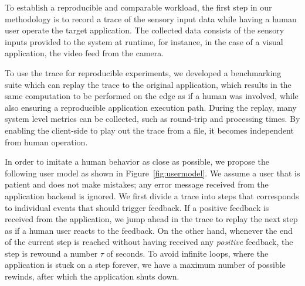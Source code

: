 

To establish a reproducible and comparable workload, the first step in our methodology is to record a trace of the sensory input data while having a human user operate the target application. 
The collected data consists of the sensory inputs provided to the system at runtime, for instance, in the case of a visual application, the video feed from the camera.

To use the trace for reproducible experiments, we developed a benchmarking suite which can replay the trace to the original application, which results in the same computation to be performed on the edge as if a human was involved, while also ensuring a reproducible application execution path.
During the replay, many system level metrics can be collected, such as round-trip and processing times.
By enabling the client-side to play out the trace from a file, it becomes independent from human operation.


In order to imitate a human behavior as close as possible, we propose the following user model as shown in Figure~\ref{fig:usermodel}.
We assume a user that is patient and does not make mistakes; any error message received from the application backend is ignored. We first divide a trace into steps that corresponds to individual events that should trigger feedback. If a positive feedback is received from the application, we jump ahead in the trace to replay the next step as if a human user reacts to the feedback. 
On the other hand, whenever the end of the current step is reached without having received any \emph{positive} feedback, the step is rewound a number $\tau$ of seconds.
To avoid infinite loops, where the application is stuck on a step forever, we have a maximum number of possible rewinds, after which the application shuts down.

